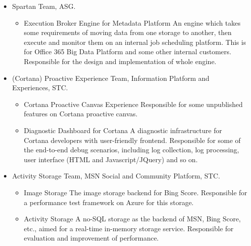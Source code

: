 \documentclass[10pt,a4paper,roman]{moderncv} %
\begin{document}
        {\begin{itemize}%
         \item Spartan Team, ASG.
               \begin{itemize}%
               \item Execution Broker Engine for Metadata Platform\newline{}%
                     An engine which takes some requirements of moving data from one storage to another, then execute and monitor them on an internal job scheduling platform. This is for Office 365 Big Data Platform and some other internal customers.\newline{}%
                     Responsible for the design and implementation of whole engine.
               \end{itemize}
         \item (Cortana) Proactive Experience Team, Information Platform and Experiences, STC.
               \begin{itemize}%
               \item Cortana Proactive Canvas Experience\newline{}%
                     Responsible for some unpublished features on Cortana proactive canvas.
               \item Diagnostic Dashboard for Cortana\newline{}%
                     A diagnostic infrastructure for Cortana developers with user-friendly frontend.\newline{}%
                     Responsible for some of the end-to-end debug scenarios, including log collection, log processing, user interface (HTML and Javascript/JQuery) and so on.
               \end{itemize}
         \item Activity Storage Team, MSN Social and Community Platform, STC.
               \begin{itemize}%
               \item Image Storage\newline{}%
                     The image storage backend for Bing Score.\newline{}%
                     Responsible for a performance test framework on Azure for this storage.
               \item Activity Storage\newline{}%
                     A no-SQL storage as the backend of MSN, Bing Score, etc., aimed for a real-time in-memory storage service.\newline{}%
                     Responsible for evaluation and improvement of performance.
               \end{itemize}
         \end{itemize}}
\end{document}
